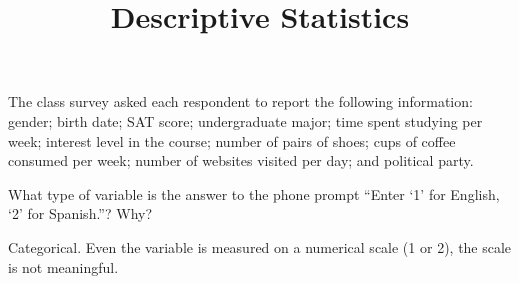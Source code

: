 \documentclass[answers,11pt]{exam}
\title{Descriptive Statistics}
\begin{document}
\begin{questions}

  



\question The class survey asked each respondent to report the following
information: gender; birth date; SAT score; undergraduate major; time spent
studying per week; interest level in the course; number of pairs of shoes;
cups of coffee consumed per week; number of websites visited per day; and
political party.



\question What type of variable is the answer to the phone prompt
``Enter `1' for English, `2' for Spanish.''?  Why?

\begin{solution}
  Categorical.  Even the variable is measured on a numerical scale (1 or 2),
  the scale is not meaningful.
\end{solution}




\end{questions}
\end{document}
